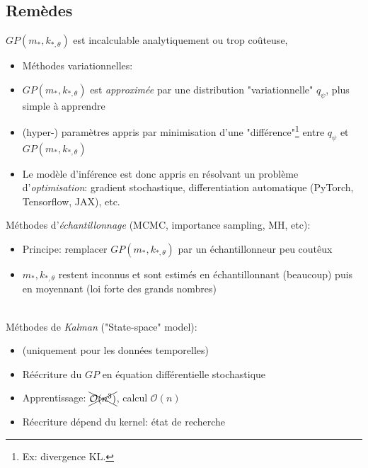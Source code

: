 \documentclass[xcolor=svgnames, t]{beamer}
\newcommand{\coloredemph}[1]{\textcolor{internationalblue}{\emph{#1}}}
\newcommand{\tored}[1]{\textcolor{red}{#1}}
\begin{document}
\subsection{Remèdes}
\begin{frame}{\subsecname}
  $GP( m_{*}, k_{*, \theta} )$ est incalculable analytiquement ou trop coûteuse,
  \begin{itemize}
    \item Méthodes variationnelles: \cite{Bruinsma2020,Hensman2015}
    \item $GP( m_{*}, k_{*, \theta} )$ est \coloredemph{approximée} par une distribution "variationnelle" $q_{\psi}$, plus simple à apprendre
    \pause
    \item (hyper-) paramètres appris par minimisation d'une "différence"\footnote{Ex: divergence KL.}  entre $q_{\psi}$ et $GP( m_{*}, k_{*, \theta} )$
    \pause
    \item Le modèle d'inférence est donc appris en résolvant un problème d'\coloredemph{optimisation}: gradient stochastique, differentiation automatique (PyTorch, Tensorflow, JAX), etc.
  \end{itemize}
\end{frame}

\begin{frame}{\subsecname}
  Méthodes d'\coloredemph{échantillonnage} (MCMC, importance sampling, MH, etc): \cite{Rasmussen2006}
  \begin{itemize}
    \item Principe: remplacer $GP( m_{*}, k_{*, \theta} )$ par un échantillonneur peu coutêux
    \pause
    \item $m_{*}, k_{*, \theta}$ restent inconnus et sont estimés en échantillonnant (beaucoup) puis en moyennant (loi forte des grands nombres)
  \end{itemize}
  \pause
  \\
  Méthodes de \coloredemph{Kalman} ("State-space" model): \cite{Solin2014,Titsias2024}
  \begin{itemize}
    \item (uniquement pour les données temporelles)
    \pause
    \item Réécriture du $GP$ en équation différentielle stochastique
    \pause
    \item Apprentissage: $\xcancel{\mathcal{O}(n^3)}$, calcul $\mathcal{O}(n)$
    \pause
    \item Réecriture dépend du kernel: état de recherche
  \end{itemize}
\end{frame}
\end{document}
